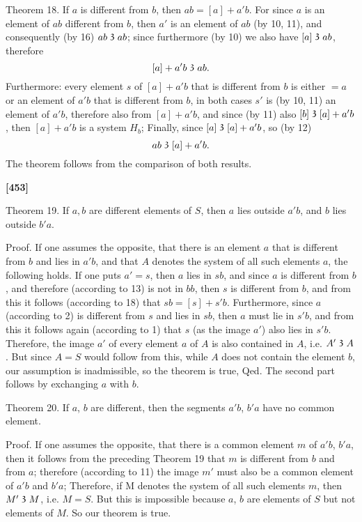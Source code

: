 \documentclass[leqno]{article}
\newcommand\partof{\mathrel{\raisebox{0.45ex}{$\mathfrak{3}$}}}
\begin{document}
Theorem 18. If $a$ is different from $b$, then $ab = [a] + a'b$.
For since $a$ is an element of $ab$ different from $b$, then $a'$ is an element of $ab$ (by 10, 11), and consequently (by 16) $ab \partof ab$; since furthermore (by 10) we also have $[a] \partof ab$, therefore
\[
	[a] + a'b \partof ab.
\]
Furthermore: every element $s$ of $[a] + a'b$ that is different from $b$ is either $= a$ or an element of $a'b$ that is different from $b$, in both cases $s'$ is (by 10, 11) an element of $a'b$, therefore also from $[a]+ a'b$, and since (by 11) also $[b] \partof [a] + a'b$, then $[a] + a'b$ is a system $H_b$; Finally, since $[a] \partof [a] + a'b$, so (by 12)
\[
	ab \partof [a] + a' b.
\]
The theorem follows from the comparison of both results.


\textbf{[453]}

Theorem 19. If $a, b$ are different elements of $S$, then $a$ lies outside $a'b$, and $b$ lies outside $b'a$.

Proof. If one assumes the opposite, that there is an element $a$ that is different from $b$ and lies in $a'b$, and that $A$ denotes the system of all such elements $a$, the following holds. 
If one puts $a'=s$, then $a$ lies in $sb$, and since $a$ is different from $b$, and therefore (according to 13) is not in $bb$, then $s$ is different from $b$, and from this it follows (according to 18) that $sb = [s] + s 'b$. 
Furthermore, since $a$ (according to 2) is different from $s$ and lies in $sb$, then $a$ must lie in $s'b$, and from this it follows again (according to 1) that $s$ (as the image $a'$) also lies in $s'b$. 
Therefore, the image $a'$ of every element $a$ of $A$ is also contained in $A$, i.e. $A' \partof A$. 
But since $A=S$ would follow from this, while $A$ does not contain the element $b$, our assumption is inadmissible, so the theorem is true, Qed. 
The second part follows by exchanging $a$ with $b$.

Theorem 20. If $a$, $b$ are different, then the segments $a'b$, $b'a$ have no common element.

Proof. If one assumes the opposite, that there is a common element $m$ of $a'b$, $b'a$, then it follows from the preceding Theorem 19 that $m$ is different from $b$ and from $a$; therefore (according to 11) the image $m'$ must also be a common element of $a'b$ and $b'a$; 
Therefore, if M denotes the system of all such elements $m$, then $M' \partof M$, i.e. $M=S$. But this is impossible because $a$, $b$ are elements of $S$ but not elements of $M$. So our theorem is true.
\end{document}
